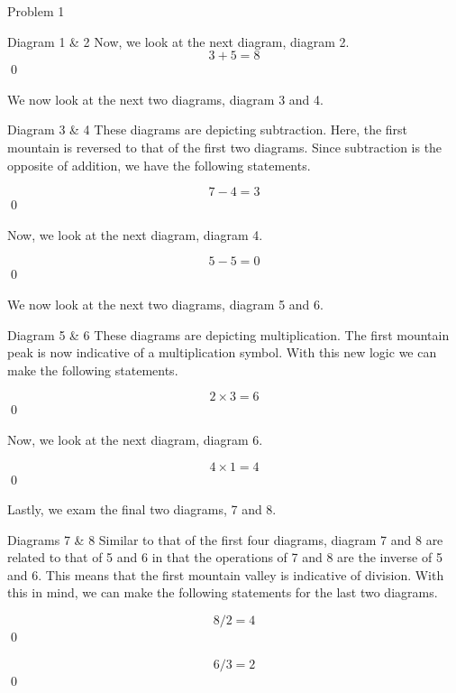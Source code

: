 \begin{problem}{Problem 1}
\begin{highlight}{Diagram 1 \& 2}
        Now, we look at the next diagram, diagram 2.
        \begin{equation}
            3 + 5 = 8
        \end{equation}
        \qed
    \end{highlight}

    We now look at the next two diagrams, diagram 3 and 4.

    \begin{highlight}{Diagram 3 \& 4}
        These diagrams are depicting subtraction. Here, the first mountain is reversed to that of the first two diagrams. Since subtraction is the opposite of addition, we have the following statements.

        \begin{equation}
            7 - 4 = 3
        \end{equation}
        \qed

        Now, we look at the next diagram, diagram 4.

        \begin{equation}
            5 - 5 = 0
        \end{equation}
        \qed
    \end{highlight}

    We now look at the next two diagrams, diagram 5 and 6.

    \begin{highlight}{Diagram 5 \& 6}
        These diagrams are depicting multiplication. The first mountain peak is now indicative of a multiplication symbol. With this new logic we can make the following statements.

        \begin{equation}
            2 \times 3 = 6
        \end{equation}
        \qed

        Now, we look at the next diagram, diagram 6.

        \begin{equation}
            4 \times 1 = 4
        \end{equation}
        \qed
    \end{highlight}

    Lastly, we exam the final two diagrams, 7 and 8.

    \begin{highlight}{Diagrams 7 \& 8}
        Similar to that of the first four diagrams, diagram 7 and 8 are related to that of 5 and 6 in that the operations of 7 and 8 are the inverse of 5 and 6. This means that the first
        mountain valley is indicative of division. With this in mind, we can make the following statements for the last two diagrams.

        \begin{equation}
            8 / 2 = 4
        \end{equation}
        \qed

        \begin{equation}
            6 / 3 = 2
        \end{equation}
        \qed
    \end{highlight}
\end{problem}

